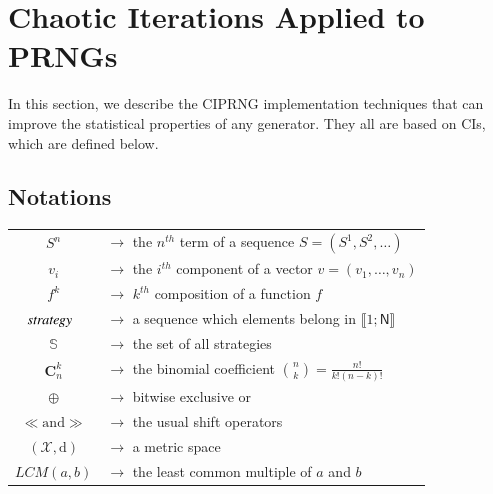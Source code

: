 \documentclass[10pt, conference, compsocconf]{IEEEtran}
\begin{document}
\section{Chaotic Iterations Applied to PRNGs}
\label{Basic recalls}


In this section, we describe the CIPRNG implementation techniques that can improve the statistical properties of any generator. They all are based on CIs, which are defined below.

\subsection{Notations}
\begin{tabular}{@{}c@{}@{}l@{}}
$S^{n}$ & $\rightarrow$ the $n^{th}$ term of a sequence $S=(S^{1},S^{2},\hdots)$ \\
$v_{i}$ & $\rightarrow$ the $i^{th}$ component of a vector $v=(v_{1},\hdots, v_n)$\\
$f^{k}$ & $\rightarrow$ $k^{th}$ composition of a function $f$ \\
$\emph{strategy}$~ & $\rightarrow$ a sequence which elements belong in $%
\llbracket 1;\mathsf{N} \rrbracket $ \\
$\mathbb{S}$ & $\rightarrow$ the set of all strategies \\
$\mathbf{C}_n^k$ & $\rightarrow$ the binomial coefficient ${n \choose k} = \frac{n!}{k!(n-k)!}$\\
$\oplus$ & $\rightarrow$ bitwise exclusive or \\
$\ll \text{and} \gg$ & $\rightarrow$ the usual shift operators \\
$(\mathcal{X}, \text{d})$ & $\rightarrow$ a metric space  \\
$LCM(a, b)$ & $\rightarrow$ the least common multiple of $a$ and $b$
\end{tabular}
\end{document}
